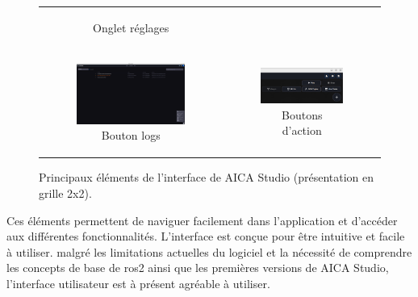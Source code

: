 \begin{figure}[H]
\begin{tabular}{cc}
\begin{subfigure}{0.45\textwidth}
            \caption{Onglet réglages}
            \label{fig:aica_rviz}
        \end{subfigure} \\
        \addlinespace[0.5em]
        \begin{subfigure}{0.45\textwidth}
            \centering
            \includegraphics[width=0.9\linewidth]{assets/figures/AICA_logs.png}
            \caption{Bouton logs}
            \label{fig:aica_logs}
        \end{subfigure} &
        \begin{subfigure}{0.45\textwidth}
            \centering
            \includegraphics[width=0.9\linewidth]{assets/figures/AICA_play_pause.png}
            \caption{Boutons d'action}
            \label{fig:aica_play_pause}
        \end{subfigure}
    \end{tabular}
    \caption{Principaux éléments de l'interface de AICA Studio (présentation en grille 2x2).}
    \label{fig:aica_interface_elements}
\end{figure}

Ces éléments permettent de naviguer facilement dans l'application et d'accéder aux différentes fonctionnalités. L'interface est conçue pour être intuitive et facile à utiliser. malgré les limitations actuelles du logiciel et la nécessité de comprendre les concepts de base de \gls{ros2} ainsi que les premières versions de AICA Studio, l'interface utilisateur est à présent agréable à utiliser.


